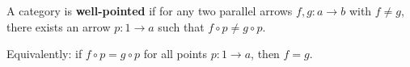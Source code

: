 A category is \textbf{well-pointed} if for any two parallel arrows $f, g : a \to b$ with $f \neq g$, there exists an arrow $p : 1 \to a$ such that $f \circ p \neq g \circ p$.

Equivalently: if $f \circ p = g \circ p$ for all points $p : 1 \to a$, then $f = g$.
